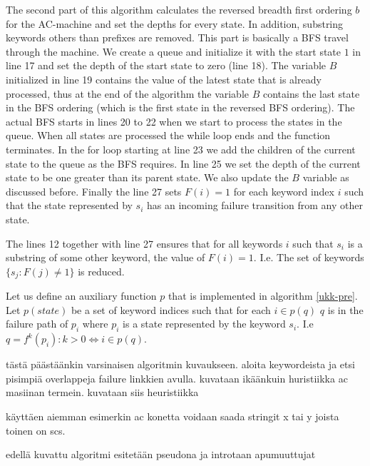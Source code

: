 \documentclass[english,twoside,censored,csm,algorithms-track-2020]{HYthesisML}
\theoremstyle{plain}
\theoremstyle{definition}
\begin{document}
The second part of this algorithm calculates the reversed breadth first ordering $b$ for the
AC-machine and set the depths for every state. In addition, substring keywords others than
prefixes are removed. This part is basically a BFS travel through the machine. We create a queue
and initialize it with the start state $1$ in line 17 and set the depth of the start state to
zero (line 18). The variable $B$ initialized in line 19 contains the value of the latest state
that is already processed, thus at the end of the algorithm the variable $B$ contains the last state
in the BFS ordering (which is the first state in the reversed BFS ordering). The actual BFS starts
in lines 20 to 22 when we start to process the states in the queue. When all states are processed
the while loop ends and the function terminates. In the for loop starting at line 23 we add the
children of the current state to the queue as the BFS requires. In line 25 we set the depth
of the current state to be one greater than its parent state. We also update the $B$ variable
as discussed before. Finally the line 27 sets $F(i) = 1$ for each keyword index $i$ such that
the state represented by $s_i$ has an incoming failure transition from any other state.

The lines 12 together with line 27 ensures that for all keywords $i$ such that $s_i$ is a substring
of some other keyword, the value of $F(i)=1$. I.e. The set of keywords $\{s_j : F(j) \neq 1\}$ is
reduced.







Let us define an auxiliary function
$p$ that is implemented in algorithm \ref{ukk-pre}. Let $p(state)$ be a set of keyword indices
such that for each $i\in p(q)$ $q$ is in the failure path of $p_i$ where $p_i$ is a state
represented by the keyword $s_i$. I.e $q = f^k(p_i) : k>0 \iff i\in p(q)$.


tästä päästäänkin varsinaisen algoritmin kuvaukseen. aloita keywordeista ja etsi pisimpiä
overlappeja failure linkkien avulla. kuvataan ikäänkuin huristiikka ac masiinan termein.
kuvataan siis heuristiikka

käyttäen aiemman esimerkin ac konetta voidaan saada stringit x tai y joista toinen on scs.

edellä kuvattu algoritmi esitetään pseudona ja introtaan apumuuttujat
\end{document}
